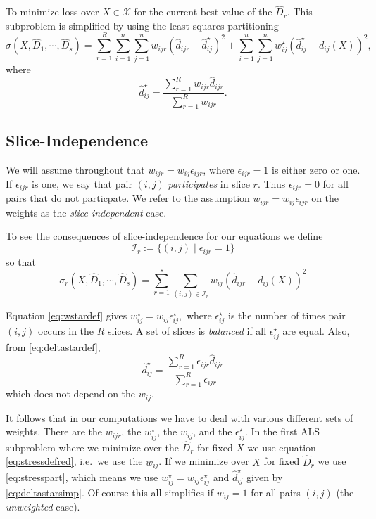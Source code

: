\documentclass[
  12pt,
]{article}
\begin{document}
To minimize loss over \(X\in\mathcal{X}\) for the current best value of the \(\hat D_r\). This subproblem is simplified by using the least squares partitioning
\begin{equation}
\sigma(X,\hat D_1,\cdots,\hat D_s)=\sum_{r=1}^R\sum_{i=1}^n\sum_{j=1}^nw_{ijr}(\hat d_{ijr}-\hat d_{ij}^\star)^2+\sum_{i=1}^n\sum_{j=1}^nw_{ij}^\star(\hat d_{ij}^\star-d_{ij}(X))^2,
\label{eq:stresspart}
\end{equation}
where
\begin{equation}
\hat d_{ij}^\star=\frac{\sum_{r=1}^R w_{ijr}\hat d_{ijr}}{\sum_{r=1}^R w_{ijr}}.
\label{eq:deltastardef}
\end{equation}

\subsection{Slice-Independence}\label{slice-independence}

We will assume throughout that \(w_{ijr}=w_{ij}\epsilon_{ijr}\), where
\(\epsilon_{ijr}=1\) is either zero or one. If \(\epsilon_{ijr}\) is one, we say that pair \((i,j)\) \emph{participates} in slice \(r\). Thus \(\epsilon_{ijr}=0\) for all pairs that do not particpate. We refer to the assumption \(w_{ijr}=w_{ij}\epsilon_{ijr}\) on the weights as the \emph{slice-independent} case.

To see the consequences of slice-independence for our equations
we define
\begin{equation}
\mathcal{I}_r:=\{(i, j)\mid \epsilon_{ijr}= 1\}
\label{eq:irdef}
\end{equation}
so that
\begin{equation}
\sigma_r(X,\hat D_1,\cdots,\hat D_s)=\sum_{r=1}^s\sum_{(i,j)\in\mathcal{I}_r} w_{ij}(\hat d_{ijr}-d_{ij}(X))^2
\label{eq:stressdefred}
\end{equation}

Equation \eqref{eq:wstardef} gives \(w_{ij}^\star=w_{ij}\epsilon_{ij}^\star,\)
where \(\epsilon_{ij}^\star\) is the number of times pair \((i,j)\) occurs in
the \(R\) slices. A set of slices is \emph{balanced} if all \(\epsilon_{ij}^\star\) are equal. Also, from \eqref{eq:deltastardef},
\begin{equation}
\hat d_{ij}^\star=\frac{\sum_{r=1}^R \epsilon_{ijr}\hat d_{ijr}}{\sum_{r=1}^R \epsilon_{ijr}}
\label{eq:deltastarsimp}
\end{equation}
which does not depend on the \(w_{ij}\).

It follows that in our computations we have to deal with various
different sets of weights. There are the \(w_{ijr}\), the \(w_{ij}^\star\),
the \(w_{ij}\), and the \(\epsilon_{ij}^\star\). In the first ALS subproblem
where we minimize over the \(\hat D_r\) for fixed \(X\) we use
equation \eqref{eq:stressdefred}, i.e.~we use the \(w_{ij}\). If we minimize over \(X\) for fixed \(\hat D_r\) we use \eqref{eq:stresspart}, which means we
use \(w_{ij}^\star=w_{ij}\epsilon_{ij}^\star\) and \(\hat d_{ij}^\star\)
given by \eqref{eq:deltastarsimp}. Of course this all simplifies
if \(w_{ij}=1\) for all pairs \((i,j)\) (the \emph{unweighted} case).
\end{document}

